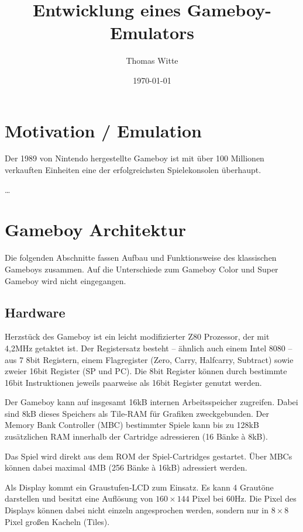 \documentclass[a4paper]{scrartcl}
\title{Entwicklung eines Gameboy-Emulators}
\author{Thomas Witte}
\date{\today}
\begin{document}
\maketitle

\section{Motivation / Emulation}

Der 1989 von Nintendo hergestellte Gameboy ist mit über 100 Millionen verkauften Einheiten eine der erfolgreichsten Spielekonsolen überhaupt.

…
\section{Gameboy Architektur}

Die folgenden Abschnitte fassen Aufbau und Funktionsweise des klassischen Gameboys zusammen. Auf die Unterschiede zum Gameboy Color und Super Gameboy wird nicht eingegangen.

\subsection{Hardware}

Herzstück des Gameboy ist ein leicht modifizierter Z80 Prozessor, der mit 4,2MHz getaktet ist. Der Registersatz besteht -- ähnlich auch einem Intel 8080 -- aus 7 8bit Registern, einem Flagregister (Zero, Carry, Halfcarry, Subtract) sowie zweier 16bit Register (SP und PC). Die 8bit Register können durch bestimmte 16bit Instruktionen jeweils paarweise als 16bit Register genutzt werden.

Der Gameboy kann auf insgesamt 16kB internen Arbeitsspeicher zugreifen. Dabei sind 8kB dieses Speichers als Tile-RAM für Grafiken zweckgebunden. Der Memory Bank Controller (MBC) bestimmter Spiele kann bis zu 128kB zusätzlichen RAM innerhalb der Cartridge adressieren (16 Bänke à 8kB).

Das Spiel wird direkt aus dem ROM der Spiel-Cartridges gestartet. Über MBCs können dabei maximal 4MB (256 Bänke à 16kB) adressiert werden.

Als Display kommt ein Graustufen-LCD zum Einsatz. Es kann 4 Grautöne darstellen und besitzt eine Auflösung von $160 \times 144$ Pixel bei 60Hz. Die Pixel des Displays können dabei nicht einzeln angesprochen werden, sondern nur in $8 \times 8$ Pixel großen Kacheln (Tiles).
\end{document}
